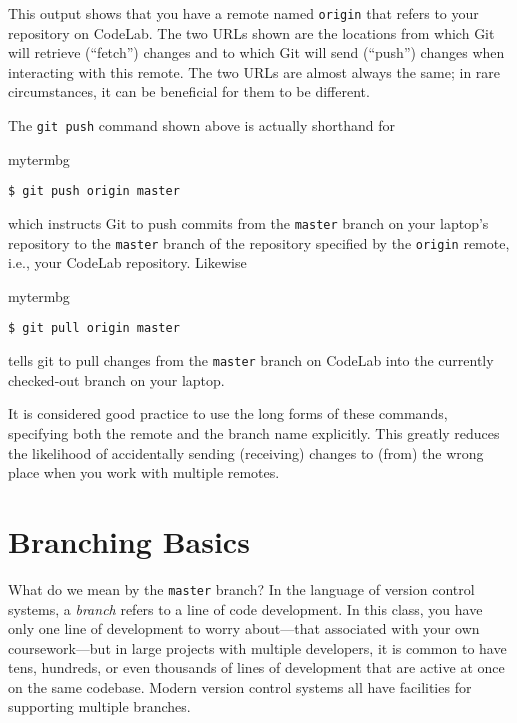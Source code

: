 This output shows that you have a remote named \texttt{origin} that refers to
your repository on CodeLab.   The two URLs shown are the locations from which
Git will retrieve (``fetch'') changes and to which Git will send (``push'')
changes when interacting with this remote.  The two URLs are almost always the
same; in rare circumstances, it can be beneficial for them to be different.

The \texttt{git push} command shown above is actually shorthand for

\begin{tsession}{mytermbg}
\begin{verbatim}
$ git push origin master
\end{verbatim}
\end{tsession}

which instructs Git to push commits from the \texttt{master} branch on your
laptop's repository to the \texttt{master} branch of the repository specified
by the \texttt{origin} remote, i.e., your CodeLab repository.  Likewise

\begin{tsession}{mytermbg}
\begin{verbatim}
$ git pull origin master
\end{verbatim}
\end{tsession}

tells git to pull changes from the \texttt{master} branch on CodeLab into the
currently checked-out branch on your laptop.

It is considered good practice to use the long forms of these commands,
specifying both the remote and the branch name explicitly.  This greatly
reduces the likelihood of accidentally sending (receiving) changes to (from)
the wrong place when you work with multiple remotes.

\section{Branching Basics}

What do we mean by the \texttt{master} branch?  In the language of version
control systems, a \emph{branch} refers to a line of code development.  In this
class, you have only one line of development to worry about---that associated
with your own coursework---but in large projects with multiple developers, it
is common to have tens, hundreds, or even thousands of lines of development
that are active at once on the same codebase.  Modern version control systems
all have facilities for supporting multiple branches.

